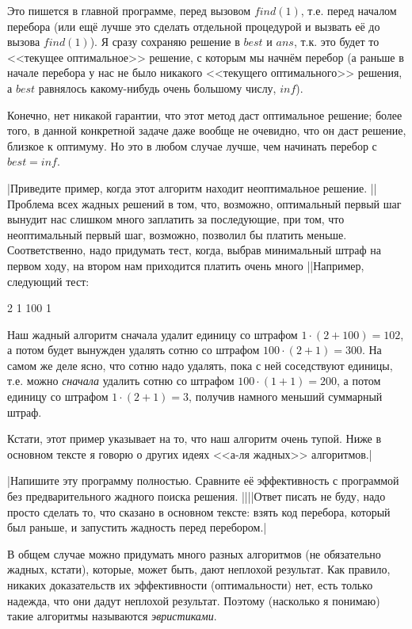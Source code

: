 Это пишется в главной программе, перед вызовом $find(1)$, т.е. перед началом перебора (или ещё лучше это сделать отдельной процедурой и вызвать её до вызова $find(1)$). Я сразу сохраняю решение в $best$ и $ans$, т.к. это будет то <<текущее оптимальное>> решение, с которым мы начнём перебор (а раньше в начале перебора у нас не было никакого <<текущего оптимального>> решения, а $best$ равнялось какому-нибудь очень большому числу, $inf$).

Конечно, нет никакой гарантии, что этот метод даст оптимальное решение; более того, в данной 
конкретной задаче даже вообще не очевидно, что он даст решение, близкое к оптимуму. Но это в 
любом случае лучше, чем начинать перебор с $best=inf$.

\task|Приведите пример, когда этот алгоритм находит неоптимальное решение.
||Проблема всех жадных решений в том, что, возможно, оптимальный первый шаг вынудит нас слишком много заплатить за последующие, при том, что неоптимальный первый шаг, возможно, позволил бы платить меньше. Соответственно, надо придумать тест, когда, выбрав минимальный штраф на первом ходу, на втором нам приходится платить очень много
||Например, следующий тест:

2 1 100 1

Наш жадный алгоритм сначала удалит единицу со штрафом $1\cdot (2+100)=102$, а потом будет вынужден удалять сотню со штрафом $100\cdot (2+1)=300$. На самом же деле ясно, что сотню надо удалять, пока с ней соседствуют единицы, т.е. можно \textit{сначала} удалить сотню со штрафом $100\cdot (1+1)=200$, а потом единицу со штрафом $1\cdot (2+1)=3$, получив намного меньший суммарный штраф.

Кстати, этот пример указывает на то, что наш алгоритм очень тупой. Ниже в основном тексте я говорю о других идеях <<а-ля жадных>> алгоритмов.|

\task|Напишите эту программу полностью. Сравните её эффективность с программой без 
предварительного жадного поиска решения.
||||Ответ писать не буду, надо просто сделать то, что сказано в основном тексте: взять код перебора, который был раньше, и запустить жадность перед перебором.|

В общем случае можно придумать много разных алгоритмов (не обязательно жадных, кстати), которые, может быть, дают неплохой 
результат. Как правило, никаких доказательств их эффективности (оптимальности) нет, есть 
только надежда, что они дадут неплохой результат. Поэтому (насколько я понимаю) такие 
алгоритмы называются \textit{эвристиками}.

